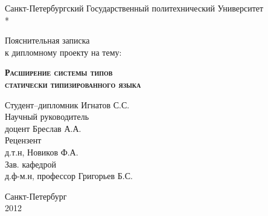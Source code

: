 \begin{titlepage}
\newpage

\begin{center}
Санкт-Петербургский Государственный политехнический Университет \\*
\hrulefill
\end{center}


\vspace{8em}

\begin{center}
\Large Пояснительная записка \\ к дипломному проекту на тему:
\end{center}

\vspace{2.5em}

\begin{center}
\textsc{\textbf{Расширение системы типов \\ статически типизированного языка}}
\end{center}

\vspace{6em}

\begin{flushleft}
Студент--дипломник \hrulefill Игнатов С.С. \\
\vspace{1.5em}
Научный руководитель \\
доцент \hrulefill Бреслав А.А.\\
\vspace{1.5em}
Рецензент \\
д.т.н, \hrulefill Новиков Ф.А.\\
\vspace{1.5em}
Зав. кафедрой  \\
д.ф-м.н, профессор \hrulefill Григорьев Б.С.
\end{flushleft}

\vspace{\fill}

\begin{center}
Санкт-Петербург \\ 2012
\end{center}

\end{titlepage}